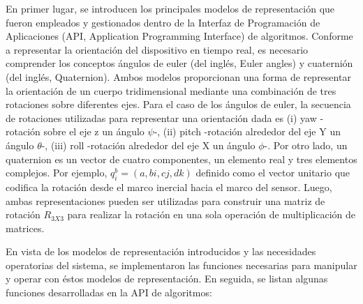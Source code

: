 En primer lugar, se introducen los principales modelos de representación que fueron empleados y gestionados dentro de la Interfaz de Programación de Aplicaciones (\gls{API}, Application Programming Interface) de algoritmos.
\noindent Conforme a representar la orientación del dispositivo en tiempo real, es necesario comprender los conceptos ángulos de euler (del inglés, Euler angles) y cuaternión (del inglés, Quaternion). Ambos modelos proporcionan una forma de representar la orientación de un cuerpo tridimensional mediante una combinación de tres rotaciones sobre diferentes ejes. Para el caso de los ángulos de euler, la secuencia de rotaciones utilizadas para representar una orientación dada es (i) yaw -rotación sobre el eje z un ángulo $\psi$-, (ii) pitch -rotación alrededor del eje Y un ángulo $\theta$-, (iii) roll -rotación alrededor del eje X un ángulo $\phi$-. Por otro lado, un quaternion es un vector de cuatro componentes, un elemento real y tres elementos complejos. Por ejemplo, $q^b_i = (a,bi,cj,dk)$  definido como el vector unitario que codifica la rotación desde el marco inercial hacia el marco del sensor. Luego, ambas representaciones pueden ser utilizadas para construir una matriz de rotación $R_{3X3}$ para realizar la rotación en una sola operación de multiplicación de matrices.

En vista de los modelos de representación introducidos y las necesidades operatorias del sistema, se implementaron las funciones necesarias para manipular y operar con éstos modelos de representación. En seguida, se listan algunas funciones desarrolladas en la API de algoritmos:

